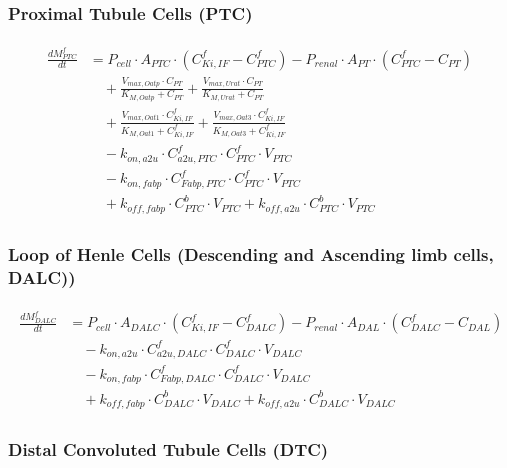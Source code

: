 \documentclass[preprint,12pt,authoryear]{elsarticle}
\begin{document}
\subsubsection{Proximal Tubule Cells (PTC)}

\begin{align}
\begin{aligned}
\frac{dM_{PTC}^f}{dt} &= P_{cell} \cdot A_{PTC} \cdot (C_{Ki,IF}^f - C_{PTC}^f)
- P_{renal} \cdot A_{PT}  \cdot (C_{PTC}^f - C_{PT}) \\
& \quad + \frac{V_{max,Oatp} \cdot C_{PT}}{K_{M,Oatp} + C_{PT}}
+ \frac{V_{max,Urat} \cdot C_{PT}}{K_{M,Urat} + C_{PT}} \\
& \quad + \frac{V_{max,Oat1} \cdot C_{Ki,IF}^f}{K_{M,Oat1} + C_{Ki,IF}^f}
+ \frac{V_{max,Oat3} \cdot C_{Ki,IF}^f}{K_{M,Oat3} + C_{Ki,IF}^f} \\
& \quad -  k_{on,a2u} \cdot C_{a2u,PTC}^f \cdot C_{PTC}^f \cdot V_{PTC}\\
& \quad - k_{on,fabp} \cdot C_{Fabp,PTC}^f \cdot C_{PTC}^f \cdot V_{PTC} \\
& \quad +  k_{off,fabp} \cdot C_{PTC}^b \cdot V_{PTC}
+ k_{off,a2u} \cdot C_{PTC}^b \cdot V_{PTC} 
\end{aligned}
\label{eq:PFOA_proximal_tubule_cells}
\end{align}

\subsubsection{Loop of Henle Cells (Descending and Ascending limb cells, DALC))}

\begin{align}
\begin{aligned}
\frac{dM_{DALC}^f}{dt} &= P_{cell} \cdot A_{DALC} \cdot (C_{Ki,IF}^f - C_{DALC}^f)
- P_{renal} \cdot A_{DAL}  \cdot (C_{DALC}^f - C_{DAL}) \\
& \quad -  k_{on,a2u} \cdot C_{a2u,DALC}^f \cdot C_{DALC}^f \cdot V_{DALC}\\
& \quad- k_{on,fabp} \cdot C_{Fabp,DALC}^f \cdot C_{DALC}^f \cdot V_{DALC}  \\
& \quad +k_{off,fabp} \cdot C_{DALC}^b \cdot V_{DALC}
+ k_{off,a2u} \cdot C_{DALC}^b \cdot V_{DALC}
\end{aligned}
\label{eq:PFOA_loop_of_henle_cells}
\end{align}

\subsubsection{Distal Convoluted Tubule Cells (DTC) }
\end{document}
